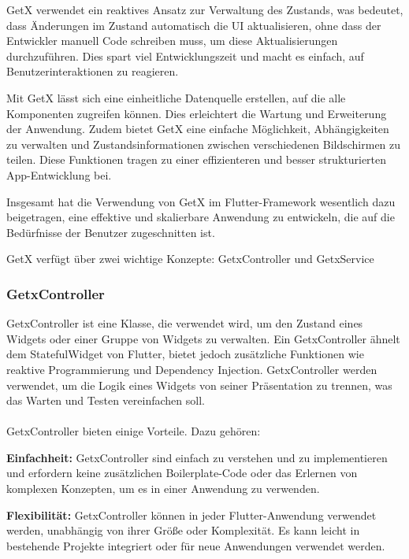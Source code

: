 GetX\cite{package_get} verwendet ein reaktives Ansatz zur Verwaltung des Zustands, was bedeutet, dass Änderungen im Zustand automatisch die UI aktualisieren, ohne dass der Entwickler manuell Code schreiben muss, um diese Aktualisierungen durchzuführen. Dies spart viel Entwicklungszeit und macht es einfach, auf Benutzerinteraktionen zu reagieren.

Mit GetX lässt sich eine einheitliche Datenquelle erstellen, auf die alle Komponenten zugreifen können. Dies erleichtert die Wartung und Erweiterung der Anwendung. Zudem bietet GetX eine einfache Möglichkeit, Abhängigkeiten zu verwalten und Zustandsinformationen zwischen verschiedenen Bildschirmen zu teilen. Diese Funktionen tragen zu einer effizienteren und besser strukturierten App-Entwicklung bei.

Insgesamt hat die Verwendung von GetX im Flutter-Framework wesentlich dazu beigetragen, eine effektive und skalierbare Anwendung zu entwickeln, die auf die Bedürfnisse der Benutzer zugeschnitten ist.



GetX verfügt über zwei wichtige Konzepte: GetxController und GetxService

\subsubsection{GetxController}
GetxController ist eine Klasse, die verwendet wird, um den Zustand eines Widgets oder einer Gruppe von Widgets zu verwalten. Ein GetxController ähnelt dem StatefulWidget von Flutter, bietet jedoch zusätzliche Funktionen wie reaktive Programmierung und Dependency Injection. GetxController werden verwendet, um die Logik eines Widgets von seiner Präsentation zu trennen, was das Warten und Testen vereinfachen soll.
\\\\
GetxController bieten einige Vorteile. Dazu gehören:

\textbf{Einfachheit:}
GetxController sind einfach zu verstehen und zu implementieren und erfordern keine zusätzlichen Boilerplate-Code oder das Erlernen von komplexen Konzepten, um es in einer Anwendung zu verwenden.

\textbf{Flexibilität:}
GetxController können in jeder Flutter-Anwendung verwendet werden, unabhängig von ihrer Größe oder Komplexität. Es kann leicht in bestehende Projekte integriert oder für neue Anwendungen verwendet werden.

